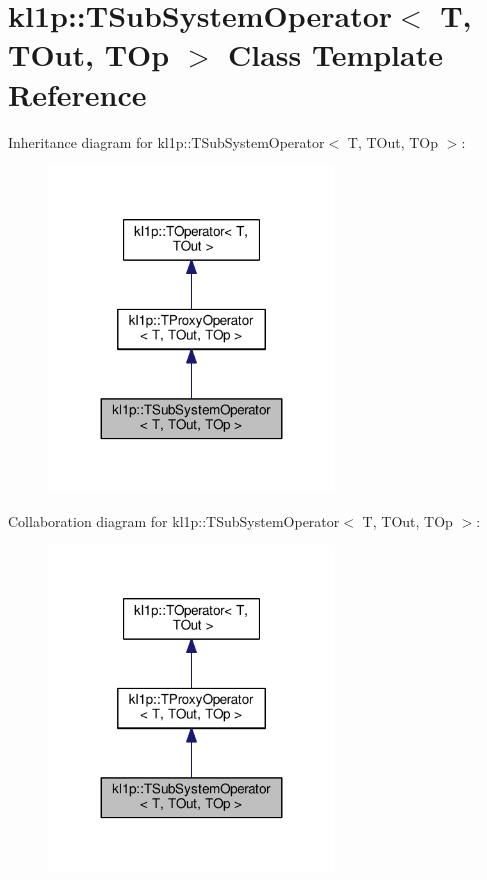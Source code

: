 \hypertarget{classkl1p_1_1TSubSystemOperator}{}\section{kl1p\+:\+:T\+Sub\+System\+Operator$<$ T, T\+Out, T\+Op $>$ Class Template Reference}
\label{classkl1p_1_1TSubSystemOperator}


Inheritance diagram for kl1p\+:\+:T\+Sub\+System\+Operator$<$ T, T\+Out, T\+Op $>$\+:
\nopagebreak
\begin{figure}[H]
\begin{center}
\leavevmode
\includegraphics[width=215pt]{classkl1p_1_1TSubSystemOperator__inherit__graph}
\end{center}
\end{figure}


Collaboration diagram for kl1p\+:\+:T\+Sub\+System\+Operator$<$ T, T\+Out, T\+Op $>$\+:
\nopagebreak
\begin{figure}[H]
\begin{center}
\leavevmode
\includegraphics[width=215pt]{classkl1p_1_1TSubSystemOperator__coll__graph}
\end{center}
\end{figure}
